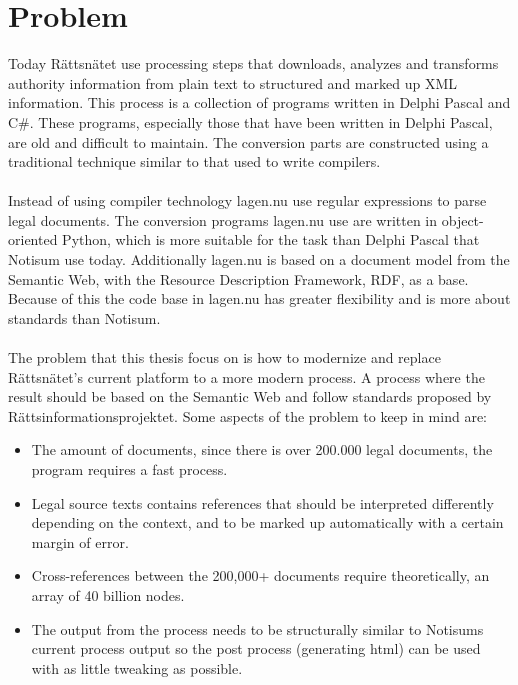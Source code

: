 \documentclass[a4paper,11pt]{kth-mag}
\begin{document}
\section{Problem}
Today Rättsnätet use processing steps that downloads, analyzes and transforms authority information from plain text to structured and marked up XML information. This process is a collection of programs written in Delphi Pascal and C\#. These programs, especially those that have been written in Delphi Pascal, are old and difficult to maintain. The conversion parts are constructed using a traditional technique similar to that used to write compilers.\\\\
Instead of using compiler technology lagen.nu use regular expressions to parse legal documents. The conversion programs lagen.nu use are written in object-oriented Python, which is more suitable for the task than Delphi Pascal that Notisum use today. Additionally lagen.nu is based on a document model from the Semantic Web, with the Resource Description Framework, RDF, as a base. Because of this the code base in lagen.nu has greater flexibility and is more about standards than Notisum.\\\\
The problem that this thesis focus on is how to modernize and replace Rättsnätet's current platform to a more modern process. A process where the result should be based on the Semantic Web and follow standards proposed by Rättsinformationsprojektet. Some aspects of the problem to keep in mind are:
\begin{itemize} 
\item The amount of documents, since there is over 200.000 legal documents, the program requires a fast process.
\item Legal source texts contains references that should be interpreted differently depending on the context, and to be marked up automatically with a certain margin of error.
\item Cross-references between the 200,000+ documents require theoretically, an array of 40 billion nodes.
\item The output from the process needs to be structurally similar to Notisums current process output so the post process (generating html) can be used with as little tweaking as possible.
\end{itemize}
\end{document}
